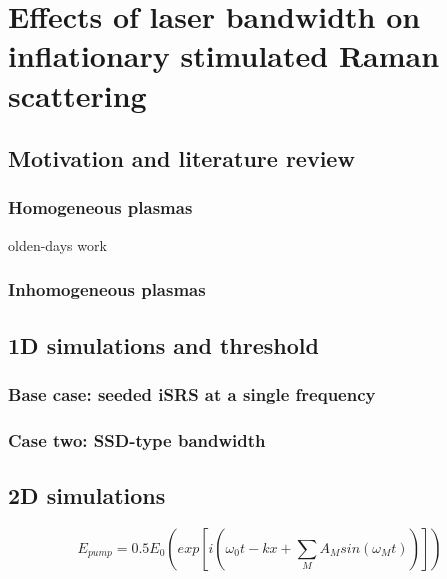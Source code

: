 \chapter{Effects of laser bandwidth on inflationary stimulated Raman scattering}
\label{chp:broadbandSRS}

\section{Motivation and literature review}
\subsection{Homogeneous plasmas}
olden-days work\cite{Thomson1974}
\subsection{Inhomogeneous plasmas}
\section{1D simulations and threshold}
\subsection{Base case: seeded iSRS at a single frequency}
\subsection{Case two: SSD-type bandwidth}
\section{2D simulations}
    $$E_{pump} = 0.5E_0\left(exp[i(\omega_0t-kx+\sum_MA_Msin(\omega_Mt))]\right)$$




